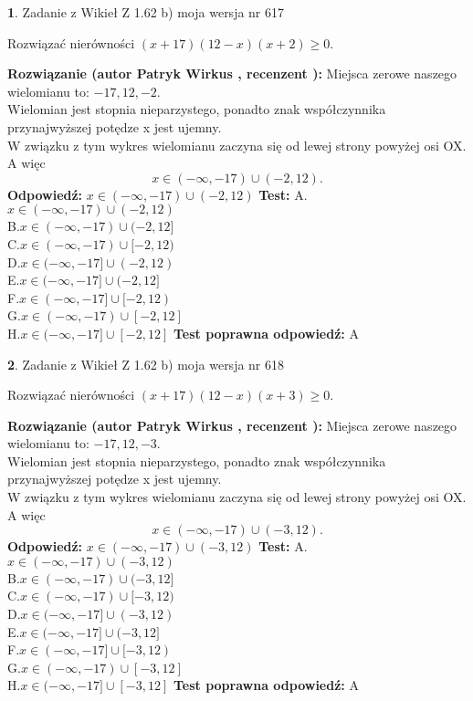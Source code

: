 \documentclass[12pt, a4paper]{article}
\theoremstyle{definition} %
\newtheorem{zad}{}
\newcommand{\zadStart}[1]{\begin{zad}#1\newline}
\newcommand{\zadStop}{\end{zad}}
\newcommand{\rozwStart}[2]{\noindent \textbf{Rozwiązanie (autor #1 , recenzent #2): }\newline}
\newcommand{\rozwStop}{\newline}
\newcommand{\odpStart}{\noindent \textbf{Odpowiedź:}\newline}
\newcommand{\odpStop}{\newline}
\newcommand{\testStart}{\noindent \textbf{Test:}\newline}
\newcommand{\testStop}{\newline}
\newcommand{\kluczStart}{\noindent \textbf{Test poprawna odpowiedź:}\newline}
\newcommand{\kluczStop}{\newline}
\begin{document}
\zadStart{Zadanie z Wikieł Z 1.62 b) moja wersja nr 617}

Rozwiązać nierówności $(x+17)(12-x)(x+2)\ge0$.
\zadStop
\rozwStart{Patryk Wirkus}{}
Miejsca zerowe naszego wielomianu to: $-17, 12, -2$.\\
Wielomian jest stopnia nieparzystego, ponadto znak współczynnika przy\linebreak najwyższej potędze x jest ujemny.\\ W związku z tym wykres wielomianu zaczyna się od lewej strony powyżej osi OX. A więc $$x \in (-\infty,-17) \cup (-2,12).$$
\rozwStop
\odpStart
$x \in (-\infty,-17) \cup (-2,12)$
\odpStop
\testStart
A.$x \in (-\infty,-17) \cup (-2,12)$\\
B.$x \in (-\infty,-17) \cup (-2,12]$\\
C.$x \in (-\infty,-17) \cup [-2,12)$\\
D.$x \in (-\infty,-17] \cup (-2,12)$\\
E.$x \in (-\infty,-17] \cup (-2,12]$\\
F.$x \in (-\infty,-17] \cup [-2,12)$\\
G.$x \in (-\infty,-17) \cup [-2,12]$\\
H.$x \in (-\infty,-17] \cup [-2,12]$
\testStop
\kluczStart
A
\kluczStop



\zadStart{Zadanie z Wikieł Z 1.62 b) moja wersja nr 618}

Rozwiązać nierówności $(x+17)(12-x)(x+3)\ge0$.
\zadStop
\rozwStart{Patryk Wirkus}{}
Miejsca zerowe naszego wielomianu to: $-17, 12, -3$.\\
Wielomian jest stopnia nieparzystego, ponadto znak współczynnika przy\linebreak najwyższej potędze x jest ujemny.\\ W związku z tym wykres wielomianu zaczyna się od lewej strony powyżej osi OX. A więc $$x \in (-\infty,-17) \cup (-3,12).$$
\rozwStop
\odpStart
$x \in (-\infty,-17) \cup (-3,12)$
\odpStop
\testStart
A.$x \in (-\infty,-17) \cup (-3,12)$\\
B.$x \in (-\infty,-17) \cup (-3,12]$\\
C.$x \in (-\infty,-17) \cup [-3,12)$\\
D.$x \in (-\infty,-17] \cup (-3,12)$\\
E.$x \in (-\infty,-17] \cup (-3,12]$\\
F.$x \in (-\infty,-17] \cup [-3,12)$\\
G.$x \in (-\infty,-17) \cup [-3,12]$\\
H.$x \in (-\infty,-17] \cup [-3,12]$
\testStop
\kluczStart
A
\kluczStop
\end{document}
